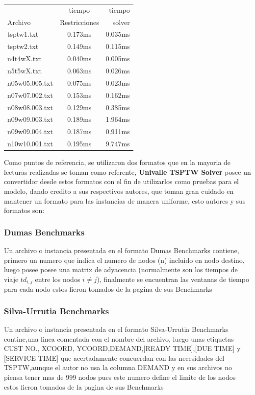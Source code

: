 \documentclass[journal, a4paper]{IEEEtran}
\begin{document}
\begin{center}
  \begin{tabular}{ || l | c | r ||}
    \hline
    & tiempo & tiempo \\ 
    Archivo & Restricciones & solver \\ \hline
    tsptw1.txt & 0.173ms & 0.035ms \\ \hline
    tsptw2.txt & 0.149ms & 0.115ms \\ \hline
    n4t4wX.txt & 0.040ms & 0.005ms \\ \hline
    n5t5wX.txt & 0.063ms & 0.026ms\\ \hline
    n05w05.005.txt & 0.075ms & 0.023ms\\ \hline
    n07w07.002.txt & 0.153ms & 0.162ms\\ \hline
    n08w08.003.txt & 0.129ms & 0.385ms \\ \hline
    n09w09.003.txt & 0.189ms & 1.964ms \\ \hline
    n09w09.004.txt & 0.187ms & 0.911ms \\ \hline
    n10w10.001.txt & 0.195ms & 9.747ms \\
    \hline
  \end{tabular}
\end{center}
Como puntos de referencia, se utilizaron dos formatos que en la 
mayoria de lecturas realizadas se toman como referente, \textbf{Univalle TSPTW Solver}
posee un convertidor desde estos formatos con el fin de utilizarlos como pruebas para el modelo,
dando credito a sus respectivos autores, que toman gran cuidado en mantener un formato
para las instancias de manera uniforme, esto autores y sus formatos son:\\
\subsubsection{Dumas Benchmarks \cite{HOP93}}
Un archivo o instancia presentada en el formato Dumas Benchmarks \cite{HOP93}
contiene, primero un numero que indica el numero de nodos (n) incluido en nodo destino,
luego posee posee una matrix de adyacencia 
(normalmente son los tiempos de viaje \( td_{i,j}\) entre los nodos \( i \neq j\)),
finalmente se encuentran las ventanas de tiempo para cada nodo estos fieron tomados
de la pagina de sus Benchmarks \cite{DUMASBENCH}
\subsubsection{Silva-Urrutia Benchmarks\cite{HOP91}}  
Un archivo o instancia presentada en el formato Silva-Urrutia Benchmarks\cite{HOP91}
contine,una linea comentada con el nombre del archivo, luego unas etiquetas 
CUST NO., XCOORD, YCOORD,DEMAND,[READY TIME],[DUE TIME] y [SERVICE TIME]
que acertadamente concuerdan con las necesidades del TSPTW,aunque el autor no usa
la columna DEMAND y en sus archivos no piensa tener mas de 999 nodos pues este numero
define el limite de los nodos estos fieron tomados de la pagina de sus Benchmarks \cite{SILVABENCH}
\end{document}
